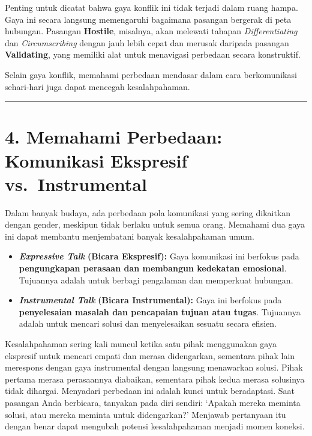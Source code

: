 \documentclass[
  letterpaper,
  DIV=11,
  numbers=noendperiod]{scrreprt}
\providecommand{\tightlist}{%
  \setlength{\itemsep}{0pt}\setlength{\parskip}{0pt}}
\begin{document}
Penting untuk dicatat bahwa gaya konflik ini tidak terjadi dalam ruang
hampa. Gaya ini secara langsung memengaruhi bagaimana pasangan bergerak
di peta hubungan. Pasangan \textbf{Hostile}, misalnya, akan melewati
tahapan \emph{Differentiating} dan \emph{Circumscribing} dengan jauh
lebih cepat dan merusak daripada pasangan \textbf{Validating}, yang
memiliki alat untuk menavigasi perbedaan secara konstruktif.

Selain gaya konflik, memahami perbedaan mendasar dalam cara
berkomunikasi sehari-hari juga dapat mencegah kesalahpahaman.

\begin{center}\rule{0.5\linewidth}{0.5pt}\end{center}

\section{4. Memahami Perbedaan: Komunikasi Ekspresif
vs.~Instrumental}\label{memahami-perbedaan-komunikasi-ekspresif-vs.-instrumental}

Dalam banyak budaya, ada perbedaan pola komunikasi yang sering dikaitkan
dengan gender, meskipun tidak berlaku untuk semua orang. Memahami dua
gaya ini dapat membantu menjembatani banyak kesalahpahaman umum.

\begin{itemize}
\tightlist
\item
  \emph{\textbf{Expressive Talk}} \textbf{(Bicara Ekspresif):} Gaya
  komunikasi ini berfokus pada \textbf{pengungkapan perasaan dan
  membangun kedekatan emosional}. Tujuannya adalah untuk berbagi
  pengalaman dan memperkuat hubungan.
\item
  \emph{\textbf{Instrumental Talk}} \textbf{(Bicara Instrumental):} Gaya
  ini berfokus pada \textbf{penyelesaian masalah dan pencapaian tujuan
  atau tugas}. Tujuannya adalah untuk mencari solusi dan menyelesaikan
  sesuatu secara efisien.
\end{itemize}

Kesalahpahaman sering kali muncul ketika satu pihak menggunakan gaya
ekspresif untuk mencari empati dan merasa didengarkan, sementara pihak
lain merespons dengan gaya instrumental dengan langsung menawarkan
solusi. Pihak pertama merasa perasaannya diabaikan, sementara pihak
kedua merasa solusinya tidak dihargai. Menyadari perbedaan ini adalah
kunci untuk beradaptasi. Saat pasangan Anda berbicara, tanyakan pada
diri sendiri: `Apakah mereka meminta solusi, atau mereka meminta untuk
didengarkan?' Menjawab pertanyaan itu dengan benar dapat mengubah
potensi kesalahpahaman menjadi momen koneksi.
\end{document}
